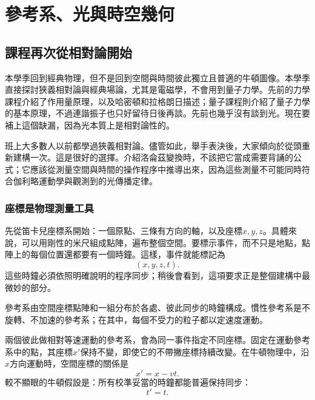 \chapter{參考系、光與時空幾何}

\section{課程再次從相對論開始}

本學季回到經典物理，但不是回到空間與時間彼此獨立且普適的牛頓圖像。本學季直接探討狹義相對論與經典場論，尤其是電磁學，不會用到量子力學。先前的力學課程介紹了作用量原理，以及哈密頓和拉格朗日描述；量子課程則介紹了量子力學的基本原理，不過連諧振子也只好留待日後再談。先前也幾乎沒有談到光。現在要補上這個缺漏，因為光本質上是相對論性的。

班上大多數人以前都學過狹義相對論。儘管如此，舉手表決後，大家傾向於從頭重新建構一次。這是很好的選擇。介紹洛侖茲變換時，不該把它當成需要背誦的公式；它應該從測量空間與時間的操作程序中推導出來，因為這些測量不可能同時符合伽利略運動學與觀測到的光傳播定律。

\subsection{座標是物理測量工具}

先從笛卡兒座標系開始：一個原點、三條有方向的軸，以及座標\(x,y,z\)。具體來說，可以用剛性的米尺組成點陣，遍布整個空間。要標示事件，而不只是地點，點陣上的每個位置還都要有一個時鐘。這樣，事件就能標記為
\begin{equation}
(x,y,z,t).
\end{equation}
這些時鐘必須依照明確說明的程序同步；稍後會看到，這項要求正是整個建構中最微妙的部分。

\begin{definition}
參考系由空間座標點陣和一組分布於各處、彼此同步的時鐘構成。慣性參考系是不旋轉、不加速的參考系；在其中，每個不受力的粒子都以定速度運動。
\end{definition}

兩個彼此做相對等速運動的參考系，會為同一事件指定不同座標。固定在運動參考系中的點，其座標\(x'\)保持不變，即使它的不帶撇座標持續改變。在牛頓物理中，沿\(x\)方向運動時，空間座標的關係是
\begin{equation}
x'=x-vt.
\label{eq:sr1-galilean-space}
\end{equation}
較不顯眼的牛頓假設是：所有校準妥當的時鐘都能普遍保持同步：
\begin{equation}
t'=t.
\label{eq:sr1-absolute-time}
\end{equation}

